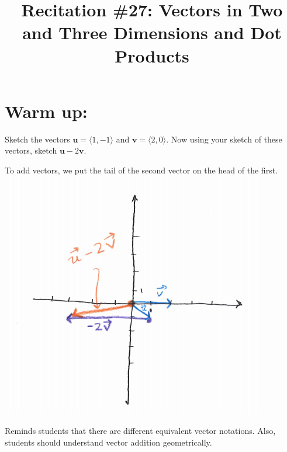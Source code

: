 \documentclass[handout]{ximera}
\title{Recitation \#27: Vectors in Two and Three Dimensions and Dot Products}
\begin{document}
\begin{abstract}		\end{abstract}
\maketitle


\section{Warm up:}

\begin{problem}
Sketch the vectors $\mathbf{u}=\langle 1, -1 \rangle$ and $\mathbf{v}=\langle 2, 0 \rangle$. Now using your sketch of these vectors, sketch $\mathbf{u}-2\mathbf{v}$.
	\begin{freeResponse}
	To add vectors, we put the tail of the second vector on the head of the first. 
		\includegraphics[scale=0.5]{Figure12-1-1}
	\end{freeResponse}
	
\begin{instructorNotes}
Reminds students that there are different equivalent vector notations. Also, students should understand vector addition geometrically.
\end{instructorNotes}

\end{problem}
\end{document}
